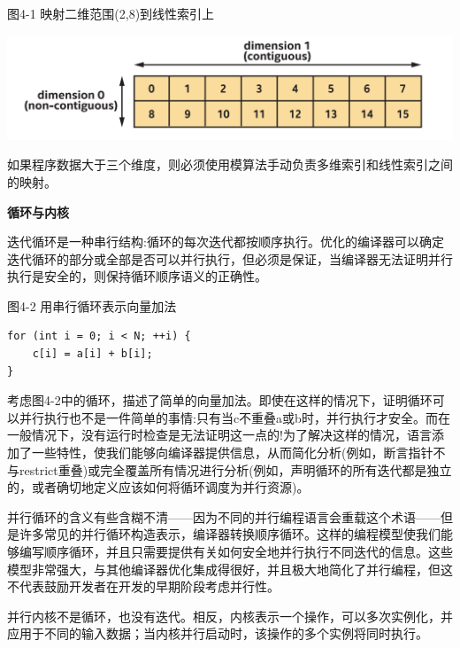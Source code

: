 \hspace*{\fill} \par %
图4-1 映射二维范围(2,8)到线性索引上
\begin{center}
	\includegraphics[width=1.\textwidth]{content/chapter-4/images/2}
\end{center}

如果程序数据大于三个维度，则必须使用模算法手动负责多维索引和线性索引之间的映射。\par

\hspace*{\fill} \par %
\textbf{循环与内核}

迭代循环是一种串行结构:循环的每次迭代都按顺序执行。优化的编译器可以确定迭代循环的部分或全部是否可以并行执行，但必须是保证，当编译器无法证明并行执行是安全的，则保持循环顺序语义的正确性。\par

\hspace*{\fill} \par %
图4-2 用串行循环表示向量加法
\begin{lstlisting}[caption={}]
for (int i = 0; i < N; ++i) {
	c[i] = a[i] + b[i];
}
\end{lstlisting}

考虑图4-2中的循环，描述了简单的向量加法。即使在这样的情况下，证明循环可以并行执行也不是一件简单的事情:只有当c不重叠a或b时，并行执行才安全。而在一般情况下，没有运行时检查是无法证明这一点的!为了解决这样的情况，语言添加了一些特性，使我们能够向编译器提供信息，从而简化分析(例如，断言指针不与restrict重叠)或完全覆盖所有情况进行分析(例如，声明循环的所有迭代都是独立的，或者确切地定义应该如何将循环调度为并行资源)。\par

并行循环的含义有些含糊不清——因为不同的并行编程语言会重载这个术语——但是许多常见的并行循环构造表示，编译器转换顺序循环。这样的编程模型使我们能够编写顺序循环，并且只需要提供有关如何安全地并行执行不同迭代的信息。这些模型非常强大，与其他编译器优化集成得很好，并且极大地简化了并行编程，但这不代表鼓励开发者在开发的早期阶段考虑并行性。\par

并行内核不是循环，也没有迭代。相反，内核表示一个操作，可以多次实例化，并应用于不同的输入数据；当内核并行启动时，该操作的多个实例将同时执行。\par

